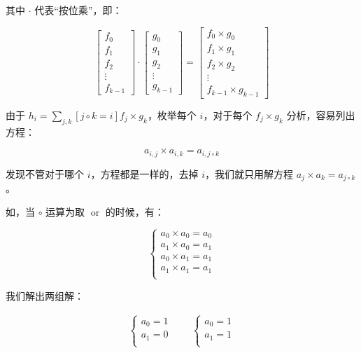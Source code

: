 \documentclass{article}
\begin{document}
其中 $\cdot$ 代表“按位乘”，即：

$$\begin{bmatrix}f_0 \\ f_1 \\ f_2 \\ \vdots \\ f_{k-1} \end{bmatrix} \cdot \begin{bmatrix}g_0 \\ g_1 \\ g_2 \\ \vdots \\ g_{k-1} \end{bmatrix} = \begin{bmatrix}f_0 \times g_0 \\ f_1 \times g_1 \\ f_2 \times g_2 \\ \vdots \\ f_{k-1} \times g_{k-1} \end{bmatrix}$$

由于 $h_{i}=\sum_{j,k} [j \circ k =i]f_{j} \times g_{k}$，枚举每个 $i$，对于每个 $f_j \times g_k$ 分析，容易列出方程：

$$a_{i,j} \times a_{i,k}=a_{i,j \circ k}$$

发现不管对于哪个 $i$，方程都是一样的，去掉 $i$，我们就只用解方程 $a_{j} \times a_{k}=a_{j \circ k}$。

如，当 $\circ$ 运算为取 $\operatorname{or}$ 的时候，有：

$$
\begin{cases}
    a_{0} \times a_{0}=a_{0} \\
    a_{1} \times a_{0}=a_{1} \\
    a_{0} \times a_{1}=a_{1} \\
    a_{1} \times a_{1}=a_{1} \\
\end{cases}
$$

我们解出两组解：

$$
\begin{aligned}
    \begin{cases}
        a_{0} =1 \\
        a_{1} =0 \\
    \end{cases}
    \qquad
    \begin{cases}
        a_{0} =1 \\
        a_{1} =1 \\
    \end{cases}
\end{aligned}
$$
\end{document}
